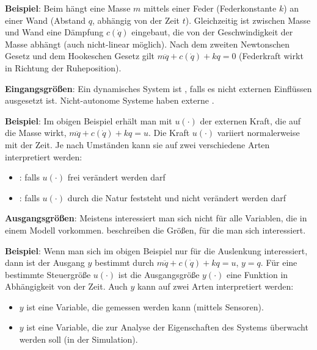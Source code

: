 \textbf{Beispiel}:
Beim  hängt eine Masse $m$ mittels
einer Feder (Federkonstante $k$) an einer Wand (Abstand $q$, abhängig von der Zeit $t$).
Gleichzeitig ist zwischen Masse und Wand eine Dämpfung $c(\dot{q})$ eingebaut, die von der
Geschwindigkeit der Masse abhängt (auch nicht-linear möglich).
Nach dem zweiten Newtonschen Gesetz und dem Hookeschen Gesetz gilt
$m \ddot{q} + c(\dot{q}) + kq = 0$
(Federkraft wirkt in Richtung der Ruheposition).

\linie

\textbf{Eingangsgrößen}:
Ein dynamisches System ist ,
falls es nicht externen Einflüssen ausgesetzt ist.
Nicht-autonome Systeme haben externe .

\textbf{Beispiel}:
Im obigen Beispiel erhält man mit $u(\cdot)$ der externen Kraft, die auf die Masse wirkt,
$m \ddot{q} + c(\dot{q}) + kq = u$.
Die Kraft $u(\cdot)$ variiert normalerweise mit der Zeit.
Je nach Umständen kann sie auf zwei verschiedene Arten interpretiert werden:
\begin{itemize}
    \item
    :
    falls $u(\cdot)$ frei verändert werden darf
    
    \item
    :
    falls $u(\cdot)$ durch die Natur feststeht und nicht verändert werden darf
\end{itemize}

\linie

\textbf{Ausgangsgrößen}:
Meistens interessiert man sich nicht für alle Variablen, die in einem Modell vorkommen.
 beschreiben die Größen, für die man sich interessiert.

\textbf{Beispiel}:
Wenn man sich im obigen Beispiel nur für die Auslenkung interessiert, dann ist der
Ausgang $y$ bestimmt durch $m \ddot{q} + c(\dot{q}) + kq = u$, $y = q$.
Für eine bestimmte Steuergröße $u(\cdot)$ ist die Ausgangsgröße $y(\cdot)$ eine Funktion in
Abhängigkeit von der Zeit.
Auch $y$ kann auf zwei Arten interpretiert werden:
\begin{itemize}
    \item
    $y$ ist eine Variable, die gemessen werden kann (mittels Sensoren).
    
    \item
    $y$ ist eine Variable, die zur Analyse der Eigenschaften des Systems überwacht werden soll
    (in der Simulation).
\end{itemize}

